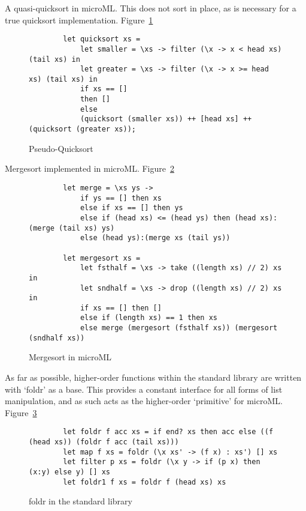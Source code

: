 A quasi-quicksort in microML\@. This does not sort in place, as is necessary for a true quicksort
implementation. Figure~\ref{fig:quicksort}

\begin{figure}[H]
    \begin{verbatim}
        let quicksort xs = 
            let smaller = \xs -> filter (\x -> x < head xs) (tail xs) in
            let greater = \xs -> filter (\x -> x >= head xs) (tail xs) in
            if xs == [] 
            then [] 
            else
            (quicksort (smaller xs)) ++ [head xs] ++ (quicksort (greater xs));
    \end{verbatim}
    \caption{Pseudo-Quicksort}
\label{fig:quicksort}
\end{figure}

Mergesort implemented in microML\@. Figure~\ref{fig:mergesort}

\begin{figure}[H]
    \begin{verbatim}
        let merge = \xs ys ->  
            if ys == [] then xs
            else if xs == [] then ys
            else if (head xs) <= (head ys) then (head xs):(merge (tail xs) ys)
            else (head ys):(merge xs (tail ys)) 

        let mergesort xs =
            let fsthalf = \xs -> take ((length xs) // 2) xs in 
            let sndhalf = \xs -> drop ((length xs) // 2) xs in
            if xs == [] then []
            else if (length xs) == 1 then xs
            else merge (mergesort (fsthalf xs)) (mergesort (sndhalf xs))
    \end{verbatim}
    \caption{Mergesort in microML}
\label{fig:mergesort}
\end{figure}

As far as possible, higher-order functions within the standard library are written with `foldr' as a
base. This provides a constant interface for all forms of list manipulation, and as such acts as the
higher-order `primitive' for microML\@. Figure~\ref{fig:foldr}

\begin{figure}[H]
    \begin{verbatim}
        let foldr f acc xs = if end? xs then acc else ((f (head xs)) (foldr f acc (tail xs)))
        let map f xs = foldr (\x xs' -> (f x) : xs') [] xs
        let filter p xs = foldr (\x y -> if (p x) then (x:y) else y) [] xs
        let foldr1 f xs = foldr f (head xs) xs
    \end{verbatim}
    \caption{foldr in the standard library}
\label{fig:foldr}
\end{figure}


